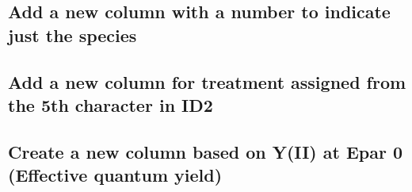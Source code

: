 \documentclass[
]{article}
\newenvironment{Shaded}{\begin{snugshade}}{\end{snugshade}}
\newcommand{\AttributeTok}[1]{\textcolor[rgb]{0.77,0.63,0.00}{#1}}
\newcommand{\DecValTok}[1]{\textcolor[rgb]{0.00,0.00,0.81}{#1}}
\newcommand{\FunctionTok}[1]{\textcolor[rgb]{0.00,0.00,0.00}{#1}}
\newcommand{\NormalTok}[1]{#1}
\newcommand{\OtherTok}[1]{\textcolor[rgb]{0.56,0.35,0.01}{#1}}
\newcommand{\SpecialCharTok}[1]{\textcolor[rgb]{0.00,0.00,0.00}{#1}}
\newcommand{\StringTok}[1]{\textcolor[rgb]{0.31,0.60,0.02}{#1}}
\begin{document}
\begin{Shaded}
\end{Shaded}

\hypertarget{add-a-new-column-with-a-number-to-indicate-just-the-species}{%
\subsection{Add a new column with a number to indicate just the
species}\label{add-a-new-column-with-a-number-to-indicate-just-the-species}}

\begin{Shaded}
\end{Shaded}

\hypertarget{add-a-new-column-for-treatment-assigned-from-the-5th-character-in-id2}{%
\subsection{Add a new column for treatment assigned from the 5th
character in
ID2}\label{add-a-new-column-for-treatment-assigned-from-the-5th-character-in-id2}}

\begin{Shaded}
\end{Shaded}

\hypertarget{create-a-new-column-based-on-yii-at-epar-0-effective-quantum-yield}{%
\subsection{Create a new column based on Y(II) at Epar 0 (Effective
quantum
yield)}\label{create-a-new-column-based-on-yii-at-epar-0-effective-quantum-yield}}
\end{document}
